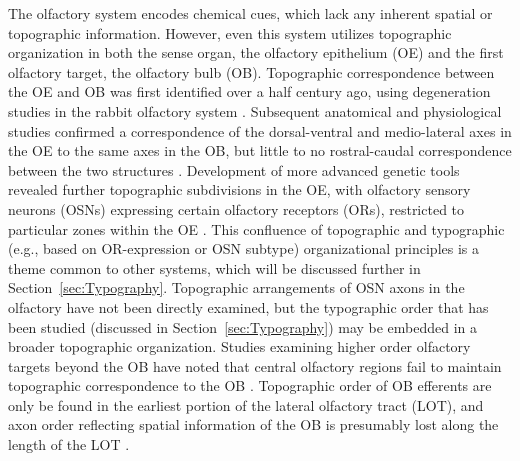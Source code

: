 The olfactory system encodes chemical cues, which lack any inherent spatial or topographic information.
However, even this system utilizes topographic organization in both the sense organ, the olfactory epithelium (OE) and the first olfactory target, the olfactory bulb (OB).
Topographic correspondence between the OE and OB was first identified over a half century ago, using degeneration studies in the rabbit olfactory system \cite{clark1951projection}.
Subsequent anatomical and physiological studies confirmed a correspondence of the dorsal-ventral and medio-lateral axes in the OE to the same axes in the OB, but little to no rostral-caudal correspondence between the two structures \cite{costanzo1978spatially,land1973localized,saucier1986analysis}.
Development of more advanced genetic tools revealed further topographic subdivisions in the OE, with olfactory sensory neurons (OSNs) expressing certain olfactory receptors (ORs), restricted to particular zones within the OE \cite{ressler1993zonal,vassar1993spatial}.
This confluence of topographic and typographic (e.g., based on OR-expression or OSN subtype) organizational principles is a theme common to other systems, which will be discussed further in Section~\ref{sec:Typography}.
Topographic arrangements of OSN axons in the olfactory have not been directly examined, but the typographic order that has been studied (discussed in Section~\ref{sec:Typography}) may be embedded in a broader topographic organization.
Studies examining higher order olfactory targets beyond the OB have noted that central olfactory regions fail to maintain topographic correspondence to the OB \cite{luskin1982distribution,sosulski2011distinct}.
Topographic order of OB efferents are only be found in the earliest portion of the lateral olfactory tract (LOT), and axon order reflecting spatial information of the OB is presumably lost along the length of the LOT \cite{price1975observation}.

